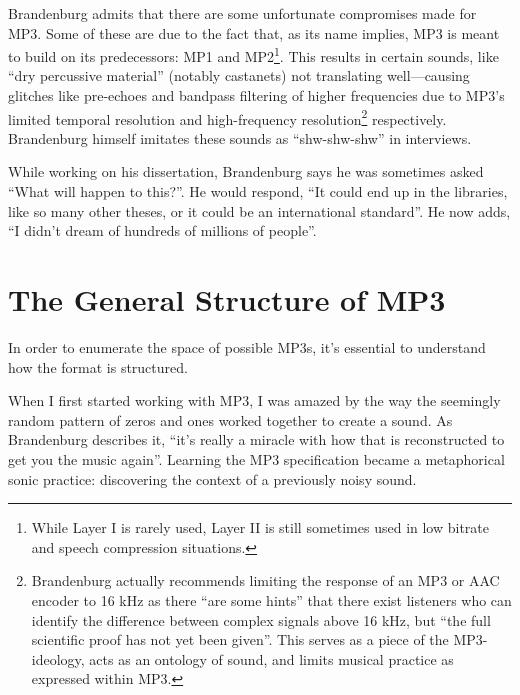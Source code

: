 \documentclass{thesis}
\begin{document}
Brandenburg admits that there are some unfortunate compromises made for MP3. Some of these are due to the fact that, as its name implies, MP3 is meant to build on its predecessors: MP1 and MP2\footnote{While Layer I is rarely used, Layer II is still sometimes used in low bitrate and speech compression situations.}. This results in certain sounds, like ``dry percussive material'' (notably castanets) not translating well\cite{karlheinz_brandenburg_mp3_1999}---causing glitches like pre-echoes and bandpass filtering of higher frequencies due to MP3's limited temporal resolution and high-frequency resolution\footnote{Brandenburg actually recommends limiting the response of an MP3 or AAC encoder to 16 kHz as there ``are some hints'' that there exist listeners who can identify the difference between complex signals above 16 kHz, but ``the full scientific proof has not yet been given''.\cite[10]{karlheinz_brandenburg_mp3_1999} This serves as a piece of the MP3-ideology, acts as an ontology of sound, and limits musical practice as expressed within MP3.} respectively. Brandenburg himself imitates these sounds as ``shw-shw-shw'' in interviews.

While working on his dissertation, Brandenburg says he was sometimes asked ``What will happen to this?''. He would respond, ``It could end up in the libraries, like so many other theses, or it could be an international standard''. He now adds, ``I didn't dream of hundreds of millions of people''.
	
\section{The General Structure of MP3}

In order to enumerate the space of possible MP3s, it's essential to understand how the format is structured.

When I first started working with MP3, I was amazed by the way the seemingly random pattern of zeros and ones worked together to create a sound. As Brandenburg describes it, ``it's really a miracle with how that is reconstructed to get you the music again''\cite{tom_merritt_real_2010}. Learning the MP3 specification became a metaphorical sonic practice: discovering the context of a previously noisy sound.
\end{document}
